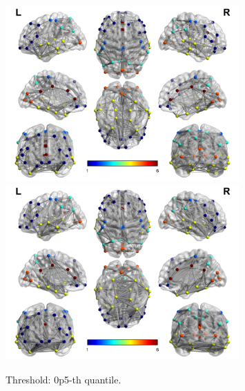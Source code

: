 \documentclass[12pt]{article}
\begin{document}
\begin{figure}
\centering
\includegraphics[width=0.8\textwidth]{correlations_early_0p5.png}
\includegraphics[width=0.8\textwidth]{correlations_late_0p5.png}
\caption{Threshold: 0p5-th quantile.}
\end{figure}
\end{document}
